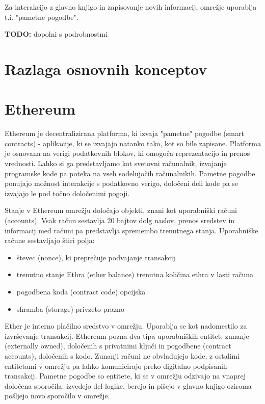 \documentclass[a4paper, 12pt]{book}
\begin{document}
Za interakcijo z glavno knjigo in zapisovanje novih informacij, omrežje uporablja t.i. "pametne pogodbe". \cite{hyperledgerDocs}

\textbf{TODO:} dopolni s podrobnostmi

\section{Razlaga osnovnih konceptov}

\section{Ethereum}
Ethereum je decentralizirana platforma, ki izvaja "pametne" pogodbe (smart contracts) - aplikacije, ki se izvajajo natanko tako, kot so bile zapisane.
Platforma je osnovana na verigi podatkovnih blokov, ki omogoča reprezentacijo in prenos vrednosti.
Lahko si ga predstavljamo kot svetovni računalnik, izvajanje programske kode pa poteka na vseh sodelujočih računalnikih.
Pametne pogodbe ponujajo možnost interakcije s podatkovno verigo, določeni deli kode pa se izvajajo le pod točno določenimi pogoji.

Stanje v Ethereum omrežju določajo objekti, znani kot uporabniški računi (accounts).
Vsak račun sestavlja 20 bajtov dolg naslov, prenos sredstev in informacij med računi pa predstavlja spremembo trenutnega stanja.
Uporabniške račune sestavljajo štiri polja:
\begin{itemize}
\item števec (nonce), ki preprečuje podvajanje transakcij
\item trenutno stanje Ethra (ether balance) trenutna količina ethra v lasti računa
\item pogodbena koda (contract code) opcijska
\item shramba (storage) privzeto prazno
\end{itemize}

Ether je interno plačilno sredstvo v omrežju.
Uporablja se kot nadomestilo za izvrševanje transakcij.
Ethereum pozna dva tipa uporabniških entitet: zunanje (externally owned), določenih s privatnimi ključi in pogodbene (contract accounts), določenih s kodo.
Zunanji računi ne obvladujejo kode, z ostalimi entitetami v omrežju pa lahko komunicirajo preko digitalno podpisanih transakcij.
Pametne pogodbe so entitete, ki se v omrežju odzivajo na vnaprej določena sporočila: izvedejo del logike, berejo in pišejo v glavno knjigo oziroma pošljejo novo sporočilo v omrežje.
\end{document}
